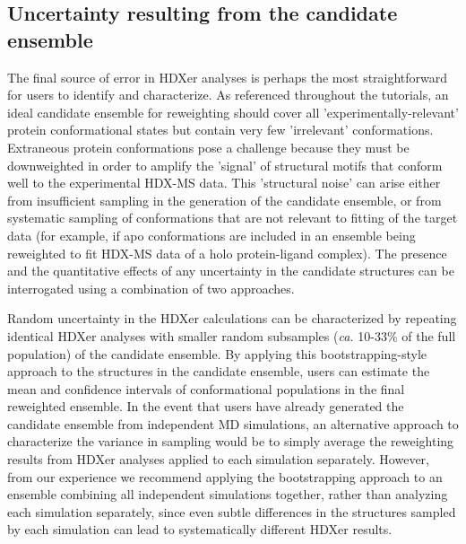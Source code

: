 \documentclass[9pt,tutorial,ASAPversion]{livecoms}
\begin{document}
\subsection{Uncertainty resulting from the candidate ensemble}\label{ensemble_uncertainty_sect}
The final source of error in HDXer analyses is perhaps the most straightforward for users to identify and characterize.
As referenced throughout the tutorials, an ideal candidate ensemble for reweighting should cover all 'experimentally-relevant' protein conformational states but contain very few 'irrelevant' conformations.
Extraneous protein conformations pose a challenge because they must be downweighted in order to amplify the 'signal' of structural motifs that conform well to the experimental HDX-MS data.
This 'structural noise' can arise either from insufficient sampling in the generation of the candidate ensemble, or from systematic sampling of conformations that are not relevant to fitting of the target data (for example, if apo conformations are included in an ensemble being reweighted to fit HDX-MS data of a holo protein-ligand complex).
The presence and the quantitative effects of any uncertainty in the candidate structures can be interrogated using a combination of two approaches.

Random uncertainty in the HDXer calculations can be characterized by repeating identical HDXer analyses with smaller random subsamples (\textit{ca.} 10-33\% of the full population) of the candidate ensemble.
By applying this bootstrapping-style approach to the structures in the candidate ensemble, users can estimate the mean and confidence intervals of conformational populations in the final reweighted ensemble.
In the event that users have already generated the candidate ensemble from independent MD simulations, an alternative approach to characterize the variance in sampling would be to simply average the reweighting results from HDXer analyses applied to each simulation separately.
However, from our experience we recommend applying the bootstrapping approach to an ensemble combining all independent simulations together, rather than analyzing each simulation separately, since even subtle differences in the structures sampled by each simulation can lead to systematically different HDXer results.
\end{document}
